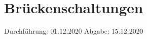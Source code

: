 

\subject{V302}
\title{Brückenschaltungen}
\date{%
  Durchführung: 01.12.2020
  \hspace{3em}
  Abgabe: 15.12.2020
}



\maketitle
\thispagestyle{empty}
\tableofcontents
\newpage






\printbibliography{}


